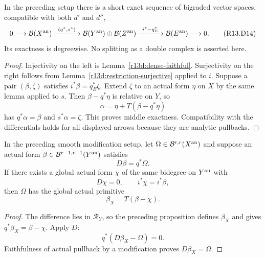 \begin{theorem}
\label{r13d:double-complex}
In the preceding setup there is a short exact sequence of bigraded
vector spaces, compatible with both $d'$ and $d''$,
\[
0\longrightarrow\mathcal B(X^{\rm an})
 \xrightarrow{\ (q^*,s^*)\ }
 \mathcal B(Y^{\rm an})\oplus\mathcal B(Z^{\rm an})
 \xrightarrow{\ i^*-q_E^*\ }
 \mathcal B(E^{\rm an})\longrightarrow0.
\tag{R13.D14}\label{r13d:short-exact}
\]
Its exactness is degreewise.  No splitting as a double complex is
asserted here.
\end{theorem}

\begin{proof}
Injectivity on the left is Lemma~\ref{r13d:dense-faithful}.
Surjectivity on the right follows from
Lemma~\ref{r13d:restriction-surjective} applied to $i$.
Suppose a pair $(\beta,\zeta)$ satisfies $i^*\beta=q_E^*\zeta$.
Extend $\zeta$ to an actual form $\eta$ on $X$ by the same lemma
applied to $s$.  Then $\beta-q^*\eta$ is relative on $Y$, so
\[
                         \alpha=\eta+T(\beta-q^*\eta)
\]
has $q^*\alpha=\beta$ and $s^*\alpha=\zeta$.
This proves middle exactness.  Compatibility with the differentials
holds for all displayed arrows because they are analytic pullbacks.
\end{proof}

\begin{theorem}
\label{r13d:closed-extension}
In the preceding smooth modification setup, let
$\Omega\in\mathcal B^{r,r}(X^{\rm an})$ and suppose an actual form
$\beta\in\mathcal B^{r-1,r-1}(Y^{\rm an})$ satisfies
\[
                             D\beta=q^*\Omega.
\]
If there exists a global actual form $\chi$ of the same bidegree on
$Y^{\rm an}$ with
\[
                         D\chi=0,\qquad i^*\chi=i^*\beta,
\tag{R13.D5}\label{r13d:closed-extension-condition}
\]
then $\Omega$ has the global actual primitive
\[
                           \beta_X=T(\beta-\chi).
\tag{R13.D6}\label{r13d:extended-primitive}
\]
\end{theorem}

\begin{proof}
The difference lies in $\mathcal R_Y$, so the preceding proposition
defines $\beta_X$ and gives $q^*\beta_X=\beta-\chi$.  Apply $D$:
\[
                      q^*(D\beta_X-\Omega)=0.
\]
Faithfulness of actual pullback by a modification proves
$D\beta_X=\Omega$.
\end{proof}


